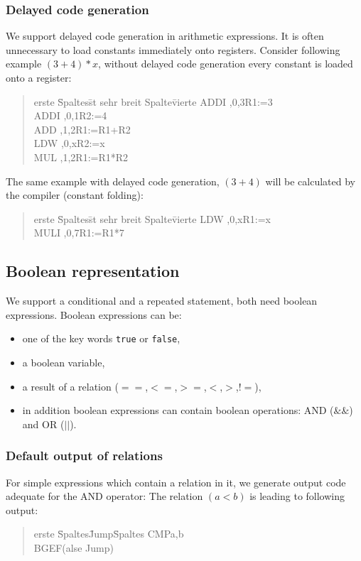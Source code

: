 \subsubsection{Delayed code generation}
We support delayed code generation in arithmetic expressions. It is often unnecessary to load constants immediately onto registers.
Consider following example $(3 + 4) * x$, without delayed code generation every constant is loaded onto a register:
\begin{quote}
\begin{tabbing}
erste \= Spaltes\=  st sehr breit Spalte\=vierte \kill
\>ADDI ,0,3\>R1:=3\\
\>ADDI ,0,1\>R2:=4\\
\>ADD ,1,2\>R1:=R1+R2\\
\>LDW ,0,x\>R2:=x\\
\>MUL ,1,2\>R1:=R1*R2\\
\end{tabbing}
\end{quote}
The same example with delayed code generation, $(3+4)$ will be calculated by the compiler (constant folding):
\begin{quote}
\begin{tabbing}
erste \= Spaltes\=  st sehr breit Spalte\=vierte \kill
\>LDW ,0,x\>R1:=x\\
\>MULI ,0,7\>R1:=R1*7\\
\end{tabbing}
\end{quote}

\subsection{Boolean representation}
\label{labelBoolean}
We support a conditional and a repeated statement, both need boolean expressions. Boolean expressions can be:
\begin{itemize}
  \item one of the key words \texttt{true} or \texttt{false},
  \item a boolean variable,
  \item a result of a relation ($==$,$<=$,$>=$,$<$,$>$,$!=$),
  \item in addition boolean expressions can contain boolean operations: AND ($ \&\& $)  and OR ($||$). 
\end{itemize}

\subsubsection{Default output of relations}
For simple expressions which contain a relation in it, we generate output code adequate for the AND operator:
The relation $(a<b)$ is leading to following output:
\begin{quote}
\begin{tabbing}
erste \= Spaltes\=  Jump\= Spaltes \kill
\>CMP\>a,b\\
\>BGE\>\>F(alse Jump)\\
\end{tabbing}
\end{quote}

